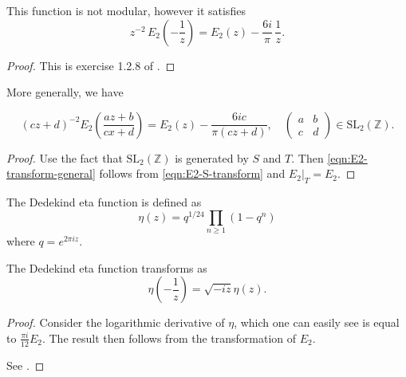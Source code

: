 \begin{lemma}\label{lemma:E2-transform-S}\leanok{}
This function is not modular, however it satisfies
\begin{equation}\label{eqn:E2-S-transform}
    z^{-2}\,E_2\left(-\frac{1}{z}\right) = E_2(z) -\frac{6i}{\pi}\, \frac{1}{z}.
\end{equation}
\end{lemma}

\begin{proof}\leanok
This is exercise 1.2.8 of \cite{first course}.
\end{proof}

More generally, we have
\begin{lemma}\label{lemma:E2-transform-general}\leanok{}
\begin{equation}\label{eqn:E2-transform-general}
(cz + d)^{-2} E_2\left(\frac{az + b}{cx + d}\right) = E_2(z) - \frac{6ic}{\pi (cz + d)}, \quad \begin{pmatrix} a & b \\ c & d\end{pmatrix} \in \mathrm{SL}_{2}(\mathbb{Z}).
\end{equation}
\end{lemma}
\begin{proof}
    \leanok
    Use the fact that $\mathrm{SL}_2(\mathbb{Z})$ is generated by $S$ and $T$.
    Then \eqref{eqn:E2-transform-general} follows from \eqref{eqn:E2-S-transform} and $E_2|_T = E_2$.
\end{proof}

\begin{definition}\label{def:dedekind_eta}\leanok {}
The Dedekind eta function is defined as
$$
    \eta(z) = q^{1/24} \prod_{n \ge 1} (1 - q^n)
$$
where $q = e^{2\pi i z}$.
\end{definition}

\begin{lemma}\label{lemma:dedekind_eta_transformation}
The Dedekind eta function transforms as
$$
    \eta\left(-\frac{1}{z}\right) = \sqrt{-iz} \eta(z).
$$
\end{lemma}
\begin{proof}
    \leanok
    Consider the logarithmic derivative of $\eta$, which one can easily see is equal to $\frac{\pi i}{12} E_2$.
    The result then follows from the transformation of $E_2$.

    See \cite[proposition 1.2.5]{first course}.
\end{proof}



